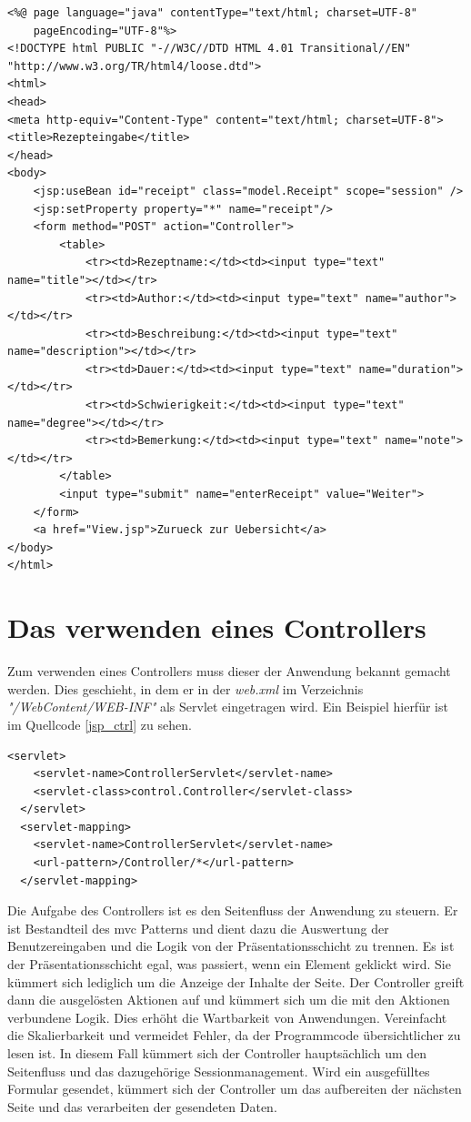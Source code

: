 \begin{lstlisting}[caption={Die Edit.jsp der Kochbuchanwendung},label=jsp_edit]
<%@ page language="java" contentType="text/html; charset=UTF-8"
    pageEncoding="UTF-8"%>
<!DOCTYPE html PUBLIC "-//W3C//DTD HTML 4.01 Transitional//EN" "http://www.w3.org/TR/html4/loose.dtd">
<html>
<head>
<meta http-equiv="Content-Type" content="text/html; charset=UTF-8">
<title>Rezepteingabe</title>
</head>
<body>
	<jsp:useBean id="receipt" class="model.Receipt" scope="session" />
	<jsp:setProperty property="*" name="receipt"/>
	<form method="POST" action="Controller">
		<table>
			<tr><td>Rezeptname:</td><td><input type="text" name="title"></td></tr>
			<tr><td>Author:</td><td><input type="text" name="author"></td></tr>
			<tr><td>Beschreibung:</td><td><input type="text" name="description"></td></tr>
			<tr><td>Dauer:</td><td><input type="text" name="duration"></td></tr>
			<tr><td>Schwierigkeit:</td><td><input type="text" name="degree"></td></tr>
			<tr><td>Bemerkung:</td><td><input type="text" name="note"></td></tr>
		</table>
		<input type="submit" name="enterReceipt" value="Weiter">
	</form>
	<a href="View.jsp">Zurueck zur Uebersicht</a>
</body>
</html>
\end{lstlisting}

\section{Das verwenden eines Controllers}
Zum verwenden eines Controllers muss dieser der Anwendung bekannt gemacht werden. Dies geschieht, in dem er in der \textit{web.xml} im Verzeichnis \textit{"/WebContent/WEB-INF"} als Servlet eingetragen wird. Ein Beispiel hierfür ist im Quellcode \ref{jsp_ctrl} zu sehen.
\begin{lstlisting}[caption={Beispielkonfiguration für einen Controller},label=jsp_ctrl]
  <servlet>
  	<servlet-name>ControllerServlet</servlet-name>
  	<servlet-class>control.Controller</servlet-class>
  </servlet>
  <servlet-mapping>
  	<servlet-name>ControllerServlet</servlet-name>
  	<url-pattern>/Controller/*</url-pattern>
  </servlet-mapping>
\end{lstlisting}
Die Aufgabe des Controllers ist es den Seitenfluss der Anwendung zu steuern. Er ist Bestandteil des \acrshort{mvc} Patterns und dient dazu die Auswertung der Benutzereingaben und die Logik von der Präsentationsschicht zu trennen. Es ist der Präsentationsschicht egal, was passiert, wenn ein Element geklickt wird. Sie kümmert sich lediglich um die Anzeige der Inhalte der Seite. Der Controller greift dann die ausgelösten Aktionen auf und kümmert sich um die mit den Aktionen verbundene Logik. Dies erhöht die Wartbarkeit von Anwendungen. Vereinfacht die Skalierbarkeit und vermeidet Fehler, da der Programmcode übersichtlicher zu lesen ist. In diesem Fall kümmert sich der Controller hauptsächlich um den Seitenfluss und das dazugehörige Sessionmanagement. Wird ein ausgefülltes Formular gesendet, kümmert sich der Controller um das aufbereiten der nächsten Seite und das verarbeiten der gesendeten Daten.

